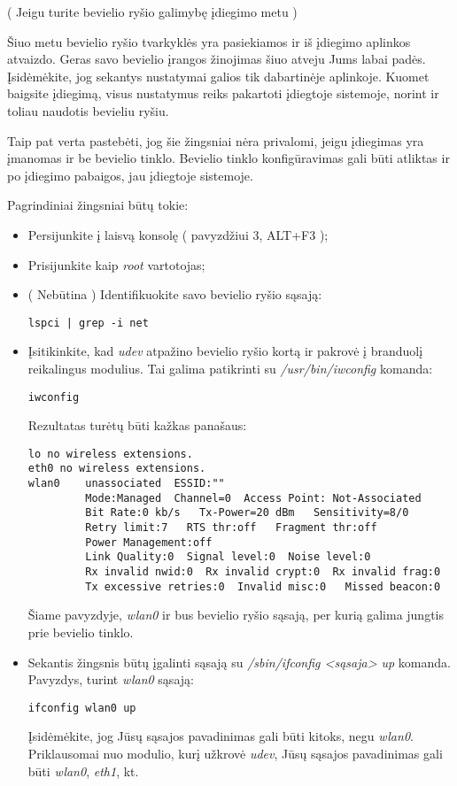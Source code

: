   ( Jeigu turite bevielio ryšio galimybę įdiegimo metu )

  Šiuo metu bevielio ryšio tvarkyklės yra pasiekiamos ir iš įdiegimo
  aplinkos atvaizdo. Geras savo bevielio įrangos žinojimas šiuo atveju
  Jums labai padės. Įsidėmėkite, jog sekantys nustatymai galios tik
  dabartinėje aplinkoje. Kuomet baigsite įdiegimą, visus nustatymus
  reiks pakartoti įdiegtoje sistemoje, norint ir toliau naudotis
  bevieliu ryšiu.

  Taip pat verta pastebėti, jog šie žingsniai nėra privalomi, jeigu
  įdiegimas yra įmanomas ir be bevielio tinklo. Bevielio tinklo
  konfigūravimas gali būti atliktas ir po įdiegimo pabaigos, jau
  įdiegtoje sistemoje.

  Pagrindiniai žingsniai būtų tokie:

  \begin{itemize}
    \item Persijunkite į laisvą konsolę ( pavyzdžiui 3, ALT+F3 );
    \item Prisijunkite kaip \textsl{root} vartotojas;
    \item ( Nebūtina ) Identifikuokite savo bevielio ryšio sąsają:
      \begin{verbatim}
lspci | grep -i net
      \end{verbatim}
    \item Įsitikinkite, kad \textsl{udev} atpažino bevielio ryšio
      kortą ir pakrovė į branduolį reikalingus modulius. Tai galima
      patikrinti su \textsl{/usr/bin/iwconfig} komanda:
\begin{verbatim}
iwconfig
\end{verbatim}
      Rezultatas turėtų būti kažkas panašaus:
\begin{verbatim}
lo no wireless extensions.
eth0 no wireless extensions.
wlan0    unassociated  ESSID:""
         Mode:Managed  Channel=0  Access Point: Not-Associated   
         Bit Rate:0 kb/s   Tx-Power=20 dBm   Sensitivity=8/0  
         Retry limit:7   RTS thr:off   Fragment thr:off
         Power Management:off
         Link Quality:0  Signal level:0  Noise level:0
         Rx invalid nwid:0  Rx invalid crypt:0  Rx invalid frag:0
         Tx excessive retries:0  Invalid misc:0   Missed beacon:0
\end{verbatim}
      Šiame pavyzdyje, \textsl{wlan0} ir bus bevielio ryšio sąsają,
      per kurią galima jungtis prie bevielio tinklo.
    \item Sekantis žingsnis būtų įgalinti sąsają su
      \textsl{/sbin/ifconfig <sąsaja> up} komanda.
      Pavyzdys, turint \textsl{wlan0} sąsają:
\begin{verbatim}
ifconfig wlan0 up
\end{verbatim}
      Įsidėmėkite, jog Jūsų sąsajos pavadinimas gali būti kitoks, negu
      \textsl{wlan0}. Priklausomai nuo modulio, kurį užkrovė
      \textsl{udev}, Jūsų sąsajos pavadinimas gali būti
      \textsl{wlan0}, \textsl{eth1}, kt.


\end{itemize}

